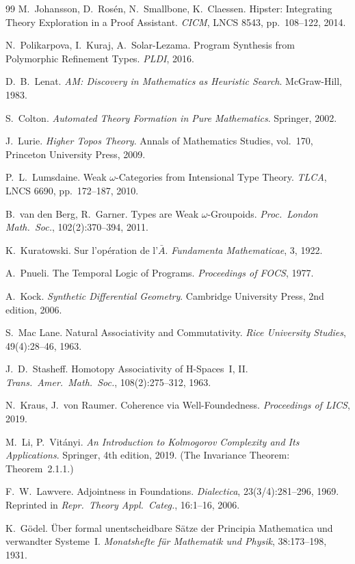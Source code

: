 \documentclass[11pt,a4paper]{article}
\theoremstyle{plain}
\theoremstyle{definition}
\theoremstyle{remark}
\begin{document}
\begin{thebibliography}{99}
M.~Johansson, D.~Ros\'en, N.~Smallbone, K.~Claessen.
Hipster: Integrating Theory Exploration in a Proof Assistant.
\textit{CICM}, LNCS 8543, pp.~108--122, 2014.

N.~Polikarpova, I.~Kuraj, A.~Solar-Lezama.
Program Synthesis from Polymorphic Refinement Types.
\textit{PLDI}, 2016.

D.~B.~Lenat.
\textit{AM: Discovery in Mathematics as Heuristic Search}.
McGraw-Hill, 1983.

S.~Colton.
\textit{Automated Theory Formation in Pure Mathematics}.
Springer, 2002.

J.~Lurie.
\textit{Higher Topos Theory}.
Annals of Mathematics Studies, vol.~170, Princeton University Press, 2009.

P.~L.~Lumsdaine.
Weak $\omega$-Categories from Intensional Type Theory.
\textit{TLCA}, LNCS 6690, pp.~172--187, 2010.

B.~van den Berg, R.~Garner.
Types are Weak $\omega$-Groupoids.
\textit{Proc.\ London Math.\ Soc.}, 102(2):370--394, 2011.

K.~Kuratowski.
Sur l'op\'eration de l'$\bar{A}$.
\textit{Fundamenta Mathematicae}, 3, 1922.

A.~Pnueli.
The Temporal Logic of Programs.
\textit{Proceedings of FOCS}, 1977.

A.~Kock.
\textit{Synthetic Differential Geometry}.
Cambridge University Press, 2nd edition, 2006.

S.~Mac Lane.
Natural Associativity and Commutativity.
\textit{Rice University Studies}, 49(4):28--46, 1963.

J.~D.~Stasheff.
Homotopy Associativity of H-Spaces~I, II.
\textit{Trans.\ Amer.\ Math.\ Soc.}, 108(2):275--312, 1963.

N.~Kraus, J.~von Raumer.
Coherence via Well-Foundedness.
\textit{Proceedings of LICS}, 2019.

M.~Li, P.~Vit\'anyi.
\textit{An Introduction to Kolmogorov Complexity and Its Applications}.
Springer, 4th edition, 2019.
(The Invariance Theorem: Theorem~2.1.1.)

F.~W.~Lawvere.
Adjointness in Foundations.
\textit{Dialectica}, 23(3/4):281--296, 1969.
Reprinted in \textit{Repr.\ Theory Appl.\ Categ.}, 16:1--16, 2006.

K.~G\"odel.
\"Uber formal unentscheidbare S\"atze der Principia Mathematica und verwandter Systeme~I.
\textit{Monatshefte f\"ur Mathematik und Physik}, 38:173--198, 1931.

\end{thebibliography}
\end{document}
